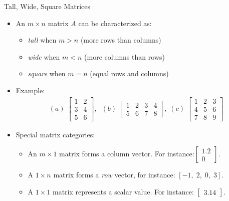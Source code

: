 \begin{frame}{Tall, Wide, Square Matrices}
\begin{itemize}
    \item An $m\times n$ matrix $A$ can be characterized as:
        \begin{itemize}
            \item \textit{tall} when $m > n$ (more rows than columns)
            \item \textit{wide} when $m < n$ (more columns than rows)
            \item \textit{square} when $m = n$ (equal rows and columns)
        \end{itemize}
    \item Example:
     \begin{align*}
        (a) \; \begin{bmatrix} 1 & 2 \\ 3 & 4 \\ 5 & 6 \end{bmatrix},\;\; (b)\;\begin{bmatrix} 1 & 2 & 3 & 4 \\ 5 & 6 & 7 & 8 \end{bmatrix}, \; (c)\;\begin{bmatrix} 1 & 2 & 3 \\ 4 & 5 & 6 \\ 7 & 8 & 9 \end{bmatrix}
    \end{align*}
    
\end{itemize}
\end{frame}

\begin{frame}
   \begin{itemize}
    \item Special matrix categories:
        \begin{itemize}
            \item An $m\times 1$ matrix forms a column vector. For instance:$\begin{bmatrix}1.2\\0\end{bmatrix}$.
            \item A $1\times n$ matrix forms a \textit{row} vector, for instance: $[-1,\;2,\;0,\;3]$.
            \item A $1\times 1$ matrix represents a scalar value. For instance: $\begin{bmatrix}3.14\end{bmatrix}$.
        \end{itemize}
\end{itemize}
\end{frame}

